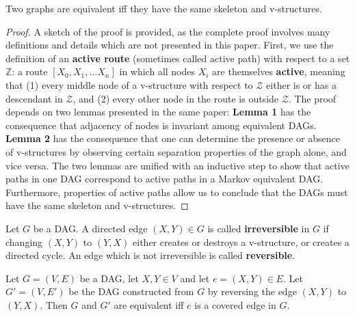 \begin{lemma}\label{meccriterion} %
Two graphs are equivalent iff they have the same skeleton and v-structures. 
\end{lemma}

\begin{proof}
A sketch of the proof is provided, as the complete proof involves many definitions and details which are not presented in this paper. First, we use the definition of an \textbf{active route} (sometimes called active path) with respect to a set $\mathbb{Z}$: a route $[X_{0}, X_{1}, ... X_{n}]$ in which all nodes $X_{i}$ are themselves \textbf{active}, meaning that (1) every middle node of a v-structure with respect to $\mathcal{Z}$ either is or has a descendant in $\mathcal{Z}$, and (2) every other node in the route is outside $\mathcal{Z}$. \newline
\null \quad \quad The proof depends on two lemmas presented in the same paper: \textbf{Lemma 1} has the consequence that adjacency of nodes is invariant among equivalent DAGs. \textbf{Lemma 2} has the consequence that one can determine the presence or absence of v-structures by observing certain separation properties of the graph alone, and vice versa. 
The two lemmas are unified with an inductive step to show that active paths in one DAG correspond to active paths in a Markov equivalent DAG. Furthermore, properties of active paths allow us to conclude that the DAGs must have the same skeleton and v-structures. 
\end{proof}

\begin{definition}
Let $G$ be a DAG. A directed edge $(X,Y) \in G$ is called \textbf{irreversible} in $G$ if changing $(X,Y)$ to $(Y,X)$ either creates or destroys a v-structure, or creates a directed cycle. An edge which is not irreversible is called \textbf{reversible}. 
\end{definition}

\begin{lemma}\label{coveredrev} %
Let $G = (V,E)$ be a DAG, let $X,Y \in V$ and let $e = (X, Y) \in E$. Let $G' = (V,E')$ be the DAG constructed from $G$ by reversing the edge $(X, Y)$ to $(Y, X)$. Then $G$ and $G'$ are equivalent iff $e$ is a covered edge in $G$.
\end{lemma}

